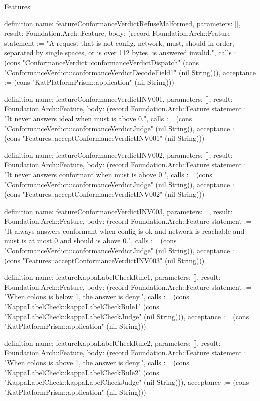 \begin{lexlean}{Features}
\begin{semanticmodule}
definition{
  name: featureConformanceVerdictRefuseMalformed,
  parameters: [],
  result: Foundation.Arch::Feature,
  body: (record Foundation.Arch::Feature {statement := "A request that is not config, network, must, should in order, separated by single spaces, or is over 112 bytes, is answered invalid.", calls := (cons "ConformanceVerdict::conformanceVerdictDispatch" (cons "ConformanceVerdict::conformanceVerdictDecodeField1" (nil String))), acceptance := (cons "KatPlatformPrism::application" (nil String))})
}

definition{
  name: featureConformanceVerdictINV001,
  parameters: [],
  result: Foundation.Arch::Feature,
  body: (record Foundation.Arch::Feature {statement := "It never answers ideal when must is above 0.", calls := (cons "ConformanceVerdict::conformanceVerdictJudge" (nil String)), acceptance := (cons "Features::acceptConformanceVerdictINV001" (nil String))})
}

definition{
  name: featureConformanceVerdictINV002,
  parameters: [],
  result: Foundation.Arch::Feature,
  body: (record Foundation.Arch::Feature {statement := "It never answers conformant when must is above 0.", calls := (cons "ConformanceVerdict::conformanceVerdictJudge" (nil String)), acceptance := (cons "Features::acceptConformanceVerdictINV002" (nil String))})
}

definition{
  name: featureConformanceVerdictINV003,
  parameters: [],
  result: Foundation.Arch::Feature,
  body: (record Foundation.Arch::Feature {statement := "It always answers conformant when config is ok and network is reachable and must is at most 0 and should is above 0.", calls := (cons "ConformanceVerdict::conformanceVerdictJudge" (nil String)), acceptance := (cons "Features::acceptConformanceVerdictINV003" (nil String))})
}

definition{
  name: featureKappaLabelCheckRule1,
  parameters: [],
  result: Foundation.Arch::Feature,
  body: (record Foundation.Arch::Feature {statement := "When colons is below 1, the answer is deny.", calls := (cons "KappaLabelCheck::kappaLabelCheckRule1" (cons "KappaLabelCheck::kappaLabelCheckJudge" (nil String))), acceptance := (cons "KatPlatformPrism::application" (nil String))})
}

definition{
  name: featureKappaLabelCheckRule2,
  parameters: [],
  result: Foundation.Arch::Feature,
  body: (record Foundation.Arch::Feature {statement := "When colons is above 1, the answer is deny.", calls := (cons "KappaLabelCheck::kappaLabelCheckRule2" (cons "KappaLabelCheck::kappaLabelCheckJudge" (nil String))), acceptance := (cons "KatPlatformPrism::application" (nil String))})
}


\end{semanticmodule}
\end{lexlean}
